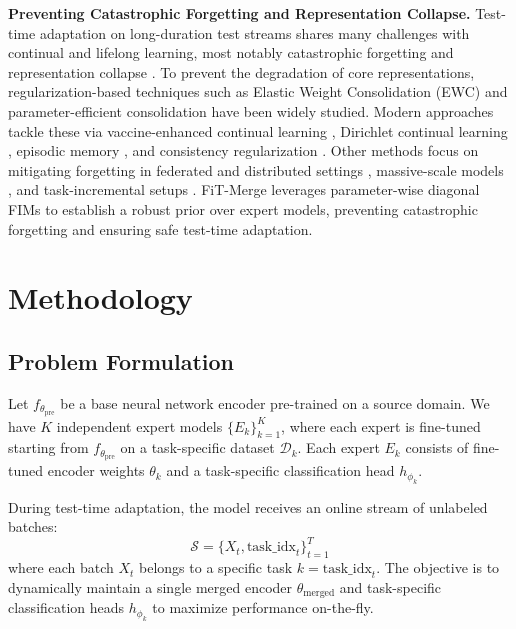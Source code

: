 \documentclass{article}
\theoremstyle{plain}
\theoremstyle{definition}
\theoremstyle{remark}
\begin{document}
\textbf{Preventing Catastrophic Forgetting and Representation Collapse.} Test-time adaptation on long-duration test streams shares many challenges with continual and lifelong learning, most notably catastrophic forgetting and representation collapse \cite{doescontinuallearningcatastrophic2021, continuallearningcatastrophicforgetting2024, mitigatingcatastrophicforgettingonline2024}. To prevent the degradation of core representations, regularization-based techniques such as Elastic Weight Consolidation (EWC) \cite{ewc} and parameter-efficient consolidation have been widely studied. Modern approaches tackle these via vaccine-enhanced continual learning \cite{vaccineenhancedcontinuallearning2024}, Dirichlet continual learning \cite{dirichletcontinuallearningtackling2024}, episodic memory \cite{episodicmemorybasedcontinual2023}, and consistency regularization \cite{consistencyiskeyfurther2022}. Other methods focus on mitigating forgetting in federated and distributed settings \cite{addressingcatastrophicforgettingfederated2023, ttafeddgleveragingtesttimeadaptation2025}, massive-scale models \cite{overcomingcatastrophicforgettingmassively2023}, and task-incremental setups \cite{mitigatingcatastrophicforgettingtaskincremental2023}. FiT-Merge leverages parameter-wise diagonal FIMs to establish a robust prior over expert models, preventing catastrophic forgetting and ensuring safe test-time adaptation.

\section{Methodology}
\label{sec:method}

\subsection{Problem Formulation}
Let $f_{\theta_{\text{pre}}}$ be a base neural network encoder pre-trained on a source domain. We have $K$ independent expert models $\{E_k\}_{k=1}^K$, where each expert is fine-tuned starting from $f_{\theta_{\text{pre}}}$ on a task-specific dataset $\mathcal{D}_k$. Each expert $E_k$ consists of fine-tuned encoder weights $\theta_k$ and a task-specific classification head $h_{\phi_k}$.

During test-time adaptation, the model receives an online stream of unlabeled batches:
$$\mathcal{S} = \{X_t, \text{task\_idx}_t\}_{t=1}^T$$
where each batch $X_t$ belongs to a specific task $k = \text{task\_idx}_t$. The objective is to dynamically maintain a single merged encoder $\theta_{\text{merged}}$ and task-specific classification heads $h_{\phi_k}$ to maximize performance on-the-fly.
\end{document}
